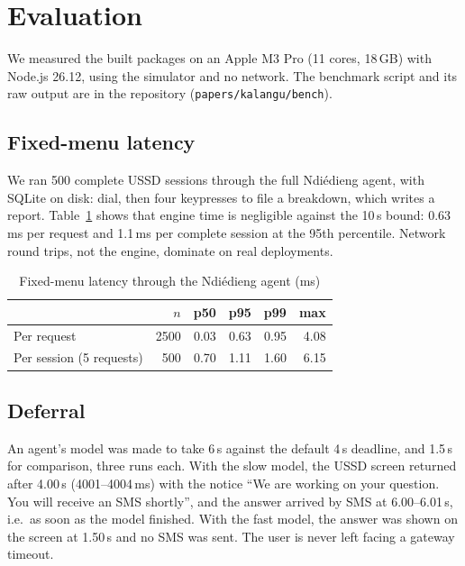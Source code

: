 \documentclass[conference]{IEEEtran}
\begin{document}
\section{Evaluation}
\label{sec:eval}

We measured the built packages on an Apple M3 Pro (11 cores, 18\,GB) with
Node.js 26.12, using the simulator and no network. The benchmark script and
its raw output are in the repository (\texttt{papers/kalangu/bench}).

\subsection{Fixed-menu latency}
We ran 500 complete USSD sessions through the full Ndi\'edieng agent, with
SQLite on disk: dial, then four keypresses to file a breakdown, which writes a
report. Table~\ref{tab:latency} shows that engine time is negligible against
the 10\,s bound: 0.63\,ms per request and 1.1\,ms per complete session at the
95th percentile. Network round trips, not the engine, dominate on real
deployments.

\begin{table}[t]
\centering
\caption{Fixed-menu latency through the Ndi\'edieng agent (ms)}
\label{tab:latency}
\begin{tabular}{@{}lrrrrr@{}}
\toprule
 & $n$ & p50 & p95 & p99 & max \\
\midrule
Per request & 2500 & 0.03 & 0.63 & 0.95 & 4.08 \\
Per session (5 requests) & 500 & 0.70 & 1.11 & 1.60 & 6.15 \\
\bottomrule
\end{tabular}
\end{table}

\subsection{Deferral}
An agent's model was made to take 6\,s against the default 4\,s deadline,
and 1.5\,s for comparison, three runs each. With the slow model, the USSD
screen returned after 4.00\,s (4001--4004\,ms) with the notice ``We are
working on your question. You will receive an SMS shortly'', and the answer
arrived by SMS at 6.00--6.01\,s, i.e.\ as soon as the model finished. With the
fast model, the answer was shown on the screen at 1.50\,s and no SMS was sent.
The user is never left facing a gateway timeout.
\end{document}
